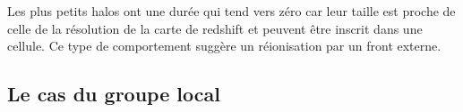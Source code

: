 Les plus petits halos ont une durée qui tend vers zéro car leur taille est proche de celle de la résolution de la carte de redshift et peuvent être inscrit dans une cellule.
Ce type de comportement suggère un réionisation par un front externe.




%
%


\subsection{Le cas du groupe local}

